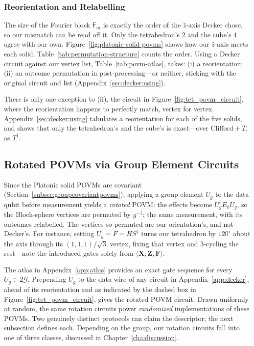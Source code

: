 \documentclass[11pt, oneside, openany]{scrbook}
\newcommand{\Ggroup}{\mathcal{G}}
\newcommand{\TwoG}{2\Ggroup}
\begin{document}
\subsubsection{Reorientation and Relabelling} \label{subsubsec:using-decker}

The size of the Fourier block $\mathsf{F}_m$ is exactly the order of the $\hat z$-axis Decker chose, so our mismatch can be read off it. Only the tetrahedron's $2$ and the cube's $4$ agree with our own. Figure~\ref{fig:platonic-solid-povms} shows how our $\hat z$-axis meets each solid; Table~\ref{tab:permutation-structure} counts the order. Using a Decker circuit against our vertex list, Table~\ref{tab:povm-atlas}, takes: (i) a reorientation; (ii) an outcome permutation in post-processing---or neither, sticking with the original circuit and list (Appendix~\ref{sec:decker:using}).

There is only one exception to (ii), the circuit in Figure~\ref{fig:tet_povm_circuit}, where the reorientation happens to perfectly match, vertex for vertex. Appendix~\ref{sec:decker:using} tabulates a reorientation for each of the five solids, and shows that only the tetrahedron's and the cube's is exact---over Clifford${}+T$, as $T^\dagger$.

\subsection{Rotated POVMs via Group Element Circuits} \label{subsec:rotated-povms}

Since the Platonic solid POVMs are covariant (Section~\ref{subsec:groupcovariantpovms}), applying a group element $U_g$ to the data qubit before measurement yields a \textit{rotated} POVM: the effects become $U_g^\dagger E_k U_g$, so the Bloch-sphere vertices are permuted by $g^{-1}$; the same measurement, with its outcomes relabelled. The vertices so permuted are our orientation's, and not Decker's. For instance, setting $U_g = F = HS^\dagger$ turns our tetrahedron by $120^{\circ}$ about the axis through its $(1,1,1)/\sqrt{3}$ vertex, fixing that vertex and $3$-cycling the rest---note the introduced gates solely from $\langle \mathbf{X}, \mathbf{Z}, \mathbf{F} \rangle$.

The atlas in Appendix~\ref{app:atlas} provides an exact gate sequence for every $U_g \in \TwoG$. Prepending $U_g$ to the data wire of any circuit in Appendix~\ref{app:decker}, ahead of its reorientation and as indicated by the dashed box in Figure~\ref{fig:tet_povm_circuit}, gives the rotated POVM circuit. Drawn uniformly at random, the same rotation circuits power \textit{randomized} implementations of these POVMs. Two genuinely distinct protocols can claim the descriptor; the next subsection defines each. Depending on the group, our rotation circuits fall into one of three classes, discussed in Chapter~\ref{cha:discussion}.
\end{document}

